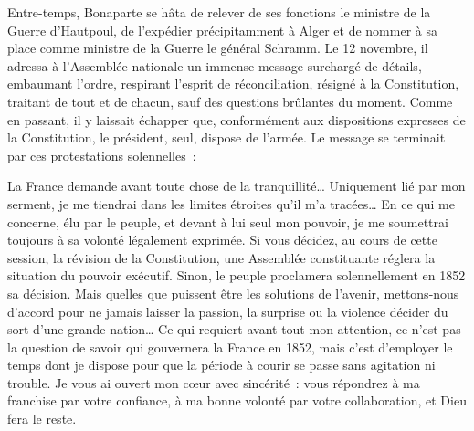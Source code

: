 \documentclass[french,twoside]{book} %
\newenvironment{quoteblock}%
  {\begin{quoting}}
  {\end{quoting}}
\newenvironment{quotebar}{%
    \def\FrameCommand{{\color{rubric!10!}\vrule width 0.5em} \hspace{0.9em}}%
    \def\OuterFrameSep{\itemsep} %
    \MakeFramed {\advance\hsize-\width \FrameRestore}
  }%
  {%
    \endMakeFramed
  }
\renewenvironment{quoteblock}%
  {%
    \savenotes
    \setstretch{0.9}
    \normalfont
    \begin{quotebar}
  }
  {%
    \end{quotebar}
    \spewnotes
  }
\begin{document}
Entre-temps, Bonaparte se hâta de relever de ses fonctions le ministre de la Guerre d’Hautpoul, de l’expédier précipitamment à Alger et de nommer à sa place comme ministre de la Guerre le général Schramm. Le 12 novembre, il adressa à l’Assemblée nationale un immense message surchargé de détails, embaumant l’ordre, respirant l’esprit de réconciliation, résigné à la Constitution, traitant de tout et de chacun, sauf des questions brûlantes du moment. Comme en passant, il y laissait échapper que, conformément aux dispositions expresses de la Constitution, le président, seul, dispose de l’armée. Le message se terminait par ces protestations solennelles :\par

\begin{quoteblock}
 \noindent La France demande avant toute chose de la tranquillité… Uniquement lié par mon serment, je me tiendrai dans les limites étroites qu’il m’a tracées… En ce qui me concerne, élu par le peuple, et devant à lui seul mon pouvoir, je me soumettrai toujours à sa volonté légalement exprimée. Si vous décidez, au cours de cette session, la révision de la Constitution, une Assemblée constituante réglera la situation du pouvoir exécutif. Sinon, le peuple proclamera solennellement en 1852 sa décision. Mais quelles que puissent être les solutions de l’avenir, mettons-nous d’accord pour ne jamais laisser la passion, la surprise ou la violence décider du sort d’une grande nation… Ce qui requiert avant tout mon attention, ce n’est pas la question de savoir qui gouvernera la France en 1852, mais c’est d’employer le temps dont je dispose pour que la période à courir se passe sans agitation ni trouble. Je vous ai ouvert mon cœur avec sincérité : vous répondrez à ma franchise par votre confiance, à ma bonne volonté par votre collaboration, et Dieu fera le reste.
\end{quoteblock}
\end{document}
